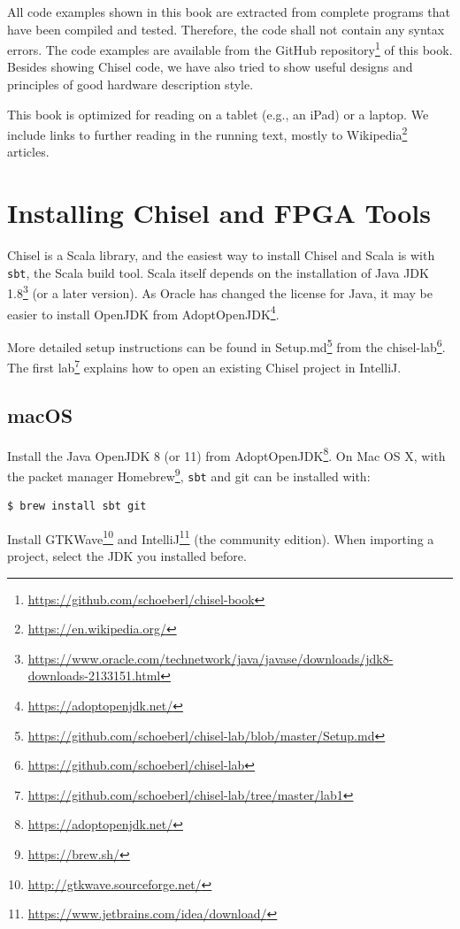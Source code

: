 \documentclass[%
    10pt,
    headinclude, footexclude,
    openright, %
    notitlepage,
    cleardoubleempty,
    headsepline,
    pointlessnumbers,
    bibtotoc, idxtotoc,
    ]{scrbook}
\newcommand{\code}[1]{{\small{\texttt{#1}}}}
\newcommand{\myref}[2]{\href{#1}{#2}}
\renewcommand{\myref}[2]{{#2}{\footnote{\url{#1}}}}
\begin{document}
All code examples shown in this book are extracted from complete programs
that have been compiled and tested. Therefore, the code shall not contain
any syntax errors. The code examples are available from the
\myref{https://github.com/schoeberl/chisel-book}{GitHub repository}
of this book.
Besides showing Chisel code, we have also tried to show useful designs and
principles of good hardware description style.

This book is optimized for reading on a tablet (e.g., an iPad) or a laptop.
We include links to further reading in the running text, mostly to
\myref{https://en.wikipedia.org/}{Wikipedia} articles.

\section{Installing Chisel and FPGA Tools}

Chisel is a Scala library, and the easiest way to install Chisel and Scala is
with \code{sbt}, the Scala build tool. Scala itself depends on the installation
of \myref{https://www.oracle.com/technetwork/java/javase/downloads/jdk8-downloads-2133151.html}{Java JDK 1.8}
(or a later version).
As Oracle has changed the license for Java, it may be easier to
install OpenJDK from \myref{https://adoptopenjdk.net/}{AdoptOpenJDK}.

More detailed setup instructions can be found in
\myref{https://github.com/schoeberl/chisel-lab/blob/master/Setup.md}{Setup.md}
from the \myref{https://github.com/schoeberl/chisel-lab}{chisel-lab}.
The \myref{https://github.com/schoeberl/chisel-lab/tree/master/lab1}{first lab}
explains how to open an existing Chisel project in IntelliJ.

\subsection{macOS}

Install the Java OpenJDK 8 (or 11) from \myref{https://adoptopenjdk.net/}{AdoptOpenJDK}.
On Mac OS X, with the packet manager \myref{https://brew.sh/}{Homebrew},
\code{sbt} and git can be installed with:

\begin{verbatim}
$ brew install sbt git
\end{verbatim}

Install \myref{http://gtkwave.sourceforge.net/}{GTKWave} and
\myref{https://www.jetbrains.com/idea/download/}{IntelliJ} (the community edition).
When importing a project, select the JDK you installed before.
\end{document}
